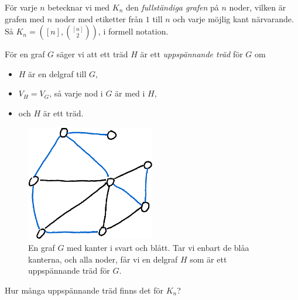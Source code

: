\documentclass[nobib]{tufte-handout}
\begin{document}
\begin{xca}
    För varje $n$ betecknar vi med $K_n$ den \emph{fullständiga grafen} på $n$ noder, vilken är grafen med $n$ noder med etiketter från $1$ till $n$ och varje möjlig kant närvarande. Så $K_n = \left([n],\binom{[n]}{2}\right)$, i formell notation.

    För en graf $G$ säger vi att ett träd $H$ är ett \emph{uppspännande träd} för $G$ om
    \begin{itemize}
        \item $H$ är en delgraf till $G$,
        \item $V_H = V_G$, så varje nod i $G$ är med i $H$,
        \item och $H$ är ett träd.
    \end{itemize}
    
    \begin{figure}
        \centering
        \includegraphics[width=0.5\textwidth]{graphics/spanning_tree_in_graph.png}
        \caption{En graf $G$ med kanter i svart och blått. Tar vi enbart de blåa kanterna, och alla noder, får vi en delgraf $H$ som är ett uppspännande träd för $G$.}
    \end{figure}

    Hur många uppspännande träd finns det för $K_n$?
\end{xca}

%
%
\end{document}
